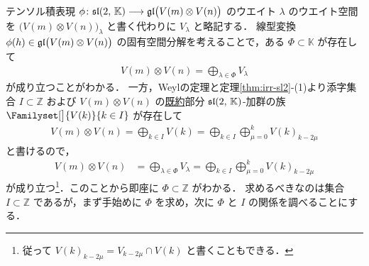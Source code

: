 \documentclass{ltjsarticle}
\theoremstyle{mystyle} %
\numberwithin{equation}{section}
\newcommand{\lto}{\longrightarrow}
\begin{document}
テンソル積表現 $\phi\colon \Lsl(2,\, \mathbb{K}) \lto \Lgl\bigl(V(m) \otimes V(n)\bigr)$ のウエイト $\lambda$ のウエイト空間を $\bigl(V(m) \otimes V(n)\bigr)_\lambda$ と書く代わりに $V_\lambda$ と略記する．
線型変換 $\phi(h) \in \mathfrak{gl}\bigl(V(m) \otimes V(n)\bigr)$ の固有空間分解を考えることで，ある $\Phi \subset \mathbb{K}$ が存在して
\begin{align}
    V(m) \otimes V(n) = \bigoplus_{\lambda \in \Phi} V_\lambda
\end{align}
が成り立つことがわかる．
一方，Weylの定理と定理\ref{thm:irr-sl2}-(1)より添字集合 $I \subset \bm{\mathbb{Z}}$ および $V(m) \otimes V(n)$ の\underline{既約}部分 $\mathfrak{sl}(2,\, \mathbb{K})$-加群の族 $\Familyset[\big]{V(k)}{k \in I}$ が存在して
\begin{align}
    V(m) \otimes V(n) = \bigoplus_{k \in I} V(k) = \bigoplus_{k \in I} \bigoplus_{\mu = 0}^{k} V(k)_{k - 2\mu}
\end{align}
と書けるので，
\begin{align}
    \label{eq:sl2-Weyl}
    V(m) \otimes V(n) &= \bigoplus_{\lambda \in \Phi} V_\lambda
    =  \bigoplus_{k \in I} \bigoplus_{\mu = 0}^{k} V(k)_{k - 2\mu}
\end{align}
が成り立つ\footnote{従って $V(k)_{k-2\mu} = V_{k-2\mu} \cap V(k)$ と書くこともできる．}．このことから即座に $\Phi \subset \mathbb{Z}$ がわかる．
求めるべきなのは集合 $I \subset \mathbb{Z}$ であるが，まず手始めに $\Phi$ を求め，次に $\Phi$ と $I$ の関係を調べることにする．


\end{document}
